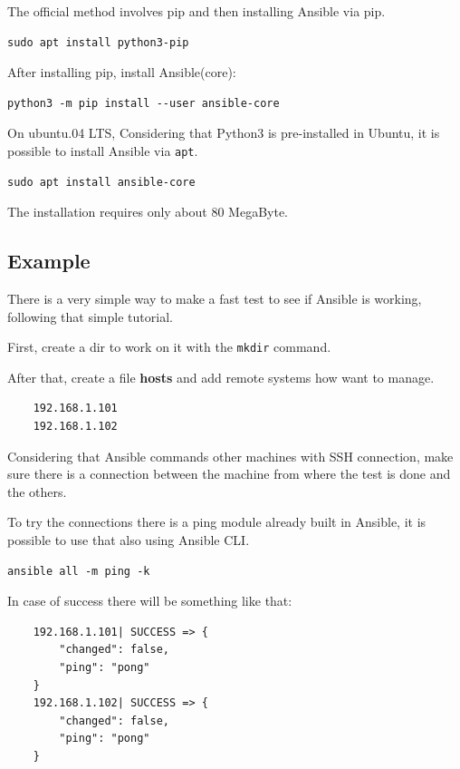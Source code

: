 \documentclass[12pt,a4paper,openright,twoside]{book}
\begin{document}
The official method involves pip and then installing Ansible via pip.
\begin{lstlisting}
sudo apt install python3-pip
\end{lstlisting}


After installing pip, install Ansible(core):

\begin{lstlisting}
python3 -m pip install --user ansible-core
\end{lstlisting}

On ubuntu.04 LTS,
Considering that Python3 is pre-installed in Ubuntu, it is possible to install Ansible via \texttt{apt}.

\begin{lstlisting}
sudo apt install ansible-core
\end{lstlisting}

The installation requires only about 80 MegaByte.

\subsection{Example}

There is a very simple way to make a fast test to see if Ansible is working, following that simple tutorial\cite{ansibleRIP}.


First, create a dir to work on it with the \texttt{mkdir} command.


After that, create a file \textbf{hosts} and add remote systems how want to manage.
\begin{lstlisting}
    192.168.1.101
    192.168.1.102
\end{lstlisting}

Considering that Ansible commands other machines with SSH connection, make sure there is a connection between the machine from where the test is done and the others.

To try the connections there is a ping module already built in Ansible, it is possible to use that also using Ansible CLI.
\begin{lstlisting}
ansible all -m ping -k
\end{lstlisting}

In case of success there will be something like that:
\begin{lstlisting}
    192.168.1.101| SUCCESS => {
        "changed": false, 
        "ping": "pong"
    }
    192.168.1.102| SUCCESS => {
        "changed": false, 
        "ping": "pong"
    }
\end{lstlisting}
\end{document}

